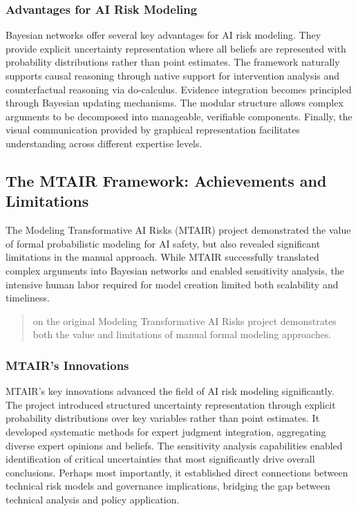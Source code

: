 \documentclass[
  11pt,
  letterpaper,
]{book}
\begin{document}
\subsubsection{Advantages for AI Risk
Modeling}\label{sec-modeling-advantages}

Bayesian networks offer several key advantages for AI risk modeling.
They provide explicit uncertainty representation where all beliefs are
represented with probability distributions rather than point estimates.
The framework naturally supports causal reasoning through native support
for intervention analysis and counterfactual reasoning via do-calculus.
Evidence integration becomes principled through Bayesian updating
mechanisms. The modular structure allows complex arguments to be
decomposed into manageable, verifiable components. Finally, the visual
communication provided by graphical representation facilitates
understanding across different expertise levels.

\subsection{The MTAIR Framework: Achievements and
Limitations}\label{sec-mtair-framework}

The Modeling Transformative AI Risks (MTAIR) project demonstrated the
value of formal probabilistic modeling for AI safety, but also revealed
significant limitations in the manual approach. While MTAIR successfully
translated complex arguments into Bayesian networks and enabled
sensitivity analysis, the intensive human labor required for model
creation limited both scalability and timeliness.

\begin{quote}
\textcite{bucknall2022} on the original Modeling Transformative AI Risks
project demonstrates both the value and limitations of manual formal
modeling approaches.
\end{quote}

\subsubsection{MTAIR's Innovations}\label{sec-mtair-innovations}

MTAIR's key innovations advanced the field of AI risk modeling
significantly. The project introduced structured uncertainty
representation through explicit probability distributions over key
variables rather than point estimates. It developed systematic methods
for expert judgment integration, aggregating diverse expert opinions and
beliefs. The sensitivity analysis capabilities enabled identification of
critical uncertainties that most significantly drive overall
conclusions. Perhaps most importantly, it established direct connections
between technical risk models and governance implications, bridging the
gap between technical analysis and policy application.
\end{document}
